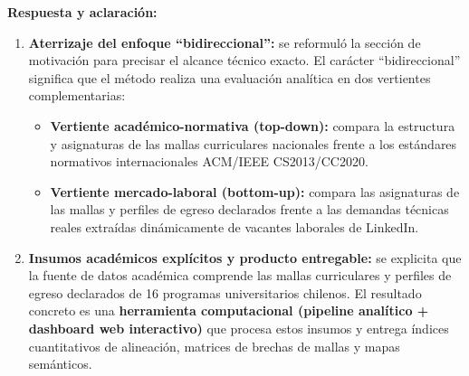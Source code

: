 \newpage

\noindent
{}

\vspace{0.2cm}

\noindent
\textbf{Respuesta y aclaración:}
\begin{enumerate}[leftmargin=*]
	\item \textbf{Aterrizaje del enfoque ``bidireccional'':} se reformuló la sección de motivación para precisar el alcance técnico exacto. El carácter ``bidireccional'' significa que el método realiza una evaluación analítica en dos vertientes complementarias:
	      \begin{itemize}
		      \item \textbf{Vertiente académico-normativa (top-down):} compara la estructura y asignaturas de las mallas curriculares nacionales frente a los estándares normativos internacionales ACM/IEEE CS2013/CC2020.
		      \item \textbf{Vertiente mercado-laboral (bottom-up):} compara las asignaturas de las mallas y perfiles de egreso declarados frente a las demandas técnicas reales extraídas dinámicamente de vacantes laborales de LinkedIn.
	      \end{itemize}
	\item \textbf{Insumos académicos explícitos y producto entregable:} se explicita que la fuente de datos académica comprende las mallas curriculares y perfiles de egreso declarados de 16 programas universitarios chilenos. El resultado concreto es una \textbf{herramienta computacional (pipeline analítico + dashboard web interactivo)} que procesa estos insumos y entrega índices cuantitativos de alineación, matrices de brechas de mallas y mapas semánticos.
\end{enumerate}

